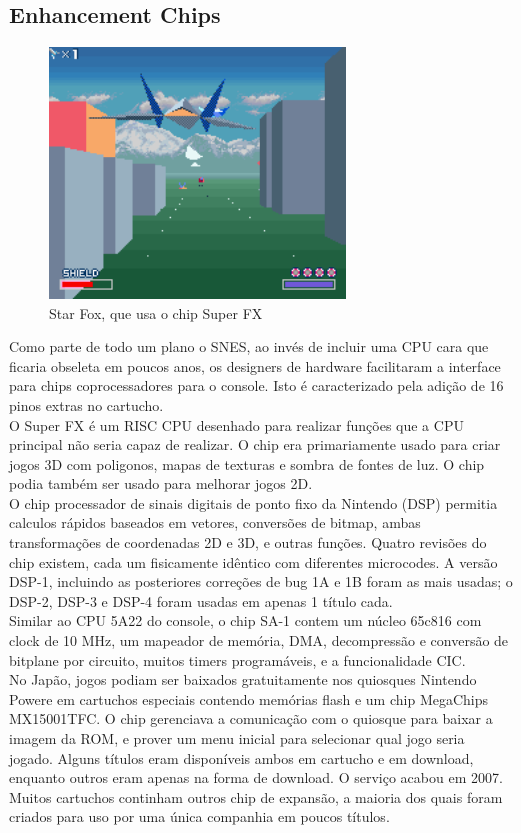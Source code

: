 \documentclass[paper=a4, fontsize=11pt]{scrartcl}	%
\numberwithin{equation}{section}															%
\numberwithin{figure}{section}																%
\numberwithin{table}{section}																%
\begin{document}
  \subsection{Enhancement Chips}
  \begin{figure}[h!]
  	\centering
      \includegraphics[width=0.7\textwidth]{img/starfox}
      \caption{Star Fox, que usa o chip Super FX}
  \end{figure}
  Como parte de todo um plano o SNES, ao invés de incluir uma CPU cara que ficaria obseleta em poucos anos, os designers de hardware facilitaram a interface para chips coprocessadores para o console. Isto é caracterizado pela adição de 16 pinos extras no cartucho.\\
  O Super FX é um RISC CPU desenhado para realizar funções que a CPU principal não seria capaz de realizar. O chip era primariamente usado para criar jogos 3D com poligonos, mapas de texturas e sombra de fontes de luz. O chip podia também ser usado para melhorar jogos 2D.\\
  O chip processador de sinais digitais de ponto fixo da Nintendo (DSP) permitia calculos rápidos baseados em vetores, conversões de bitmap, ambas transformações de coordenadas 2D e 3D, e outras funções. Quatro revisões do chip existem, cada um fisicamente idêntico com diferentes microcodes. A versão DSP-1, incluindo as posteriores correções de bug 1A e 1B foram as mais usadas; o DSP-2, DSP-3 e DSP-4 foram usadas em apenas 1 título cada.\\
  Similar ao CPU 5A22 do console, o chip SA-1 contem um núcleo 65c816 com clock de 10 MHz, um mapeador de memória, DMA, decompressão e conversão de bitplane por circuito, muitos timers programáveis, e a funcionalidade CIC.\\
No Japão, jogos podiam ser baixados gratuitamente nos quiosques Nintendo Powere em cartuchos especiais contendo memórias flash e um chip MegaChips MX15001TFC. O chip gerenciava a comunicação com o quiosque para baixar a imagem da ROM, e prover um menu inicial para selecionar qual jogo seria jogado. Alguns títulos eram disponíveis ambos em cartucho e em download, enquanto outros eram apenas na forma de download. O serviço acabou em 2007.\\
  Muitos cartuchos continham outros chip de expansão, a maioria dos quais foram criados para uso por uma única companhia em poucos títulos.
\end{document}
